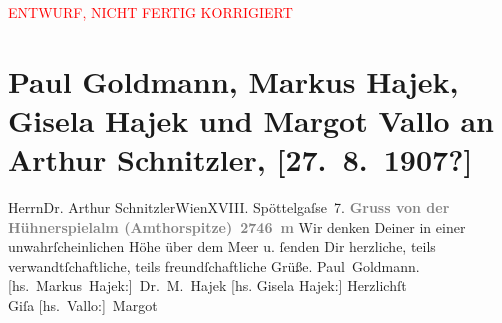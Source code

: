
\begin{center}
            \textcolor{red}{ENTWURF, NICHT FERTIG KORRIGIERT}
                      \end{center}
            
         \renewcommand{\erwaehnteOrte}{Orte: Edmund-Weiß-Gasse 7, Gossensass, Hühnerspiel, Hühnerspielalm, Wien}
         \renewcommand{\erwaehnteWerke}{}
               \section[Paul Goldmann, Markus Hajek, Gisela Hajek und Margot Vallo an Arthur Schnitzler, {[}27. 8. 1907?{]}]{ Paul Goldmann, Markus Hajek, Gisela Hajek und Margot Vallo an Arthur
               Schnitzler, {[}27. 8. 1907?{]}}\nopagebreak{}\rehead{ }\begin{ledgroupsized}[t]{13cm}\normalsize\beginnumbering \toendnotes[C]{\smallbreak\pagebreak[2]} 
\pstart{}{\pb}Herrn\pend{}\pstart{}Dr. Arthur Schnitzler\pend{}\pstart{}Wien\pend{}\pstart{}XVIII. Spöttelgaſse 7.\pend{}{\bigskip}\pstart
           \noindent{}\centering{}{\pb}\textcolor{gray}{\textbf{Gruss von der Hühnerspielalm (Amthorspitze) 2746 m}}\pend
           \pstart
           \noindent{}{\pb}Wir denken Deiner in einer unwahrſcheinlichen Höhe
               über dem Meer u. ſenden Dir herzliche, teils verwandtſchaftliche, teils
               freundſchaftliche Grüße. \spacefill\mbox{Paul Goldmann.}\pend
           \pstart
           \spacefill\mbox{{[}hs. Markus Hajek:{]} Dr. M. Hajek}\pend
           \pstart
           {[}hs. Gisela Hajek:{]} Herzlichſt {\\}\spacefill\mbox{Giſa}\pend
           \pstart
           \spacefill\mbox{{[}hs. Vallo:{]} Margot}\pend
           
         
         \endnumbering{}\end{ledgroupsized}  \newcommand{\dateiname}{L03459}\newcommand{\titel}{Paul Goldmann, Markus Hajek, Gisela Hajek und Margot Vallo an Arthur Schnitzler, [27. 8. 1907?]}\newcommand{\editorInnen}{Martin Anton Müller und Laura Untner}
      